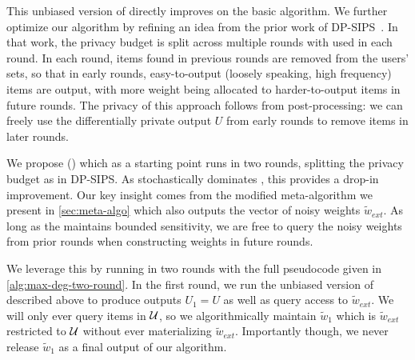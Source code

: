 This unbiased version of \ouralgo{} directly improves on the basic algorithm.
We further optimize our algorithm by refining an idea from the prior work of DP-SIPS~\cite{swanberg2023dpsips}.
In that work, the privacy budget is split across multiple rounds with \basicalgo{} used in each round.
In each round, items found in previous rounds are removed from the users' sets, so that in early rounds, easy-to-output (loosely speaking, high frequency) items are output, with more weight being allocated to harder-to-output items in future rounds.
The privacy of this approach follows from post-processing: we can freely use the differentially private output $U$ from early rounds to remove items in later rounds.

We propose \ouralgotworoundslong{} (\ouralgotworounds{}) which as a starting point runs \ouralgo{} in two rounds, splitting the privacy budget as in DP-SIPS. As \ouralgo{} stochastically dominates \basicalgo{}, this provides a drop-in improvement.
Our key insight comes from the modified meta-algorithm we present in \cref{sec:meta-algo} which also outputs the vector of noisy weights $\tilde{w}_{ext}$.
As long as the \weightalgo{} maintains bounded sensitivity, we are free to query the noisy weights from prior rounds when constructing weights in future rounds.

We leverage this by running in two rounds with the full pseudocode given in \cref{alg:max-deg-two-round}.
In the first round, we run the unbiased version of \ouralgo{} described above to produce outputs $U_1 = U$ as well as query access to $\tilde{w}_{ext}$.
We will only ever query items in $\mathcal{U}$, so we algorithmically maintain $\tilde{w}_1$ which is $\tilde{w}_{ext}$ restricted to $\mathcal{U}$ without ever materializing $\tilde{w}_{ext}$. Importantly though, we never release $\tilde{w}_1$ as a final output of our algorithm.

